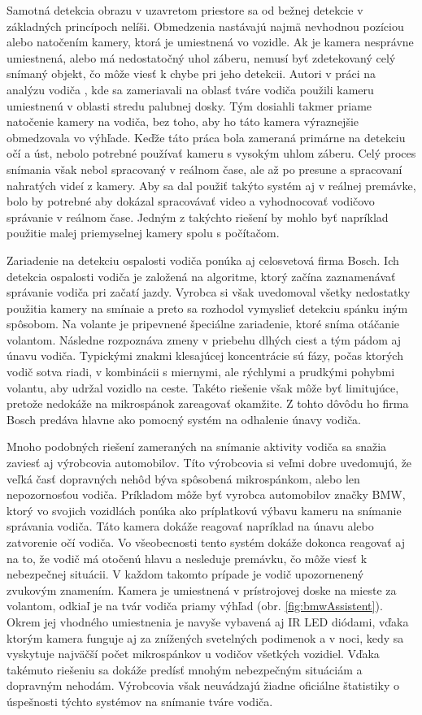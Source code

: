 \documentclass[slovak,master,dept460,male,cpp,cpdeclaration]{diploma}
\begin{document}
Samotná detekcia obrazu v uzavretom priestore sa od bežnej detekcie v základných princípoch nelíši. Obmedzenia nastávajú najmä nevhodnou pozíciou alebo natočením kamery, ktorá je umiestnená vo vozidle. Ak je kamera nesprávne umiestnená, alebo má nedostatočný uhol záberu, nemusí byť zdetekovaný celý snímaný objekt, čo môže viesť k chybe pri jeho detekcii. Autori v práci na analýzu vodiča \cite{smith2003determining}, kde sa zameriavali na oblasť tváre vodiča použili kameru umiestnenú v oblasti stredu palubnej dosky. Tým dosiahli takmer priame natočenie kamery na vodiča, bez toho, aby ho táto kamera výraznejšie obmedzovala vo výhľade. Keďže táto práca bola zameraná primárne na detekciu očí a úst, nebolo potrebné  používať kameru s vysokým uhlom záberu. Celý proces snímania však nebol spracovaný v reálnom čase, ale až po presune a spracovaní nahratých videí z kamery. Aby sa dal použiť takýto systém aj v reálnej premávke, bolo by potrebné aby dokázal spracovávať video  a vyhodnocovať vodičovo správanie v reálnom čase. Jedným z takýchto riešení by mohlo byť napríklad použitie malej priemyselnej kamery spolu s počítačom.\par
Zariadenie na detekciu ospalosti vodiča  ponúka aj celosvetová firma Bosch. Ich detekcia ospalosti vodiča je založená na algoritme, ktorý začína zaznamenávať správanie vodiča pri začatí jazdy. Vyrobca si však uvedomoval všetky nedostatky použitia kamery na smínaie a preto sa rozhodol vymyslieť detekciu  spánku iným spôsobom. Na volante je pripevnené špeciálne zariadenie, ktoré sníma otáčanie volantom. Následne rozpoznáva zmeny v priebehu dlhých ciest a tým pádom aj únavu vodiča. Typickými znakmi klesajúcej koncentrácie sú fázy, počas ktorých vodič sotva riadi, v kombinácii s miernymi, ale rýchlymi a prudkými pohybmi volantu, aby udržal vozidlo na ceste. Takéto riešenie však môže byť limitujúce, pretože nedokáže na mikrospánok zareagovať okamžite. Z tohto dôvôdu ho firma Bosch predáva hlavne ako pomocný systém na odhalenie únavy vodiča. \par
Mnoho podobných riešení zameraných na snímanie aktivity vodiča sa snažia zaviesť aj výrobcovia automobilov. Títo výrobcovia si veľmi dobre uvedomujú, že veľká časť dopravných nehôd býva spôsobená mikrospánkom, alebo len nepozornosťou vodiča. Príkladom môže byť vyrobca automobilov značky BMW, ktorý vo svojich vozidlách ponúka ako príplatkovú výbavu kameru na snímanie správania vodiča. Táto kamera dokáže reagovať napríklad na únavu alebo zatvorenie očí vodiča. Vo všeobecnosti tento systém dokáže dokonca reagovať aj na to, že vodič má otočenú hlavu a nesleduje premávku, čo môže viesť k nebezpečnej situácii. V každom takomto prípade je vodič upozornenený zvukovým znamením. Kamera je umiestnená v prístrojovej doske na mieste za volantom, odkiaľ je na tvár vodiča priamy výhľad (obr. \ref{fig:bmwAssistent}). Okrem jej vhodného umiestnenia je navyše vybavená aj IR LED diódami, vďaka ktorým kamera funguje aj za znížených svetelných podimenok a v noci, kedy sa vyskytuje najväčší počet mikrospánkov u vodičov všetkých vozidiel. Vďaka takémuto riešeniu sa dokáže predísť mnohým nebezpečným situáciám a dopravným nehodám. Výrobcovia však neuvádzajú žiadne oficiálne štatistiky o úspešnosti týchto systémov na snímanie tváre vodiča.
\end{document}
